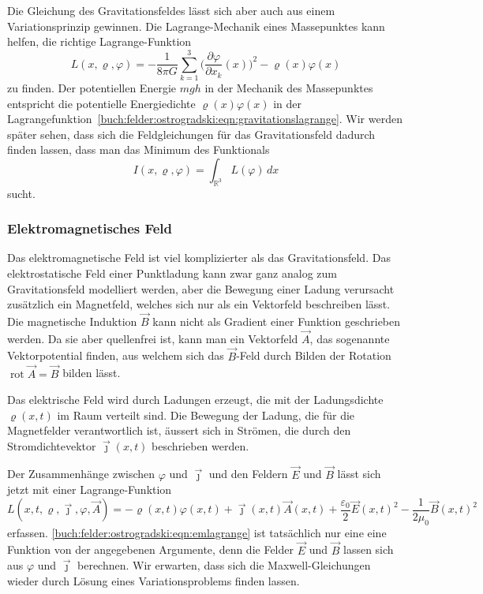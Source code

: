 Die Gleichung des Gravitationsfeldes lässt sich aber auch aus einem
Variationsprinzip gewinnen.
Die Lagrange-Mechanik eines Massepunktes kann helfen, die richtige
Lagrange-Funktion
\begin{equation}
L(x,\varrho,\varphi)
=
-\frac{1}{8\pi G}
\sum_{k=1}^3
\biggl(
\frac{\partial \varphi}{\partial x_k}(x)
\biggr)^2
-
\varrho(x)\varphi(x)
\label{buch:felder:ostrogradski:eqn:gravitationslagrange}
\end{equation}
zu finden.
Der potentiellen Energie $mgh$ in der Mechanik des Massepunktes
entspricht die potentielle Energiedichte $\varrho(x)\varphi(x)$
in der
Lagrangefunktion~\eqref{buch:felder:ostrogradski:eqn:gravitationslagrange}.
Wir werden später sehen, dass sich die Feldgleichungen für das
Gravitationsfeld dadurch finden lassen, dass man das Minimum des
Funktionals
\[
I(x,\varrho,\varphi)
=
\int_{\mathbb{R}^3} L(\varphi)
\,dx
\]
sucht.

%
%
\subsubsection{Elektromagnetisches Feld}
Das elektromagnetische Feld ist viel komplizierter als das Gravitationsfeld.
Das elektrostatische Feld einer Punktladung kann zwar ganz analog zum
Gravitationsfeld modelliert werden, aber die Bewegung einer Ladung
verursacht zusätzlich ein Magnetfeld, welches sich nur als ein
Vektorfeld beschreiben lässt.
Die magnetische Induktion $\vec{B}$ kann nicht als Gradient einer Funktion
geschrieben werden.
Da sie aber quellenfrei ist, kann man ein Vektorfeld $\vec{A}$,
das sogenannte Vektorpotential finden, aus welchem sich das $\vec{B}$-Feld
durch Bilden der Rotation $\operatorname{rot}\vec{A}=\vec{B}$ bilden
lässt.

Das elektrische Feld wird durch Ladungen erzeugt, die mit der
Ladungsdichte $\varrho(x,t)$ im Raum verteilt sind.
Die Bewegung der Ladung, die für die Magnetfelder verantwortlich ist,
äussert sich in Strömen, die durch den Stromdichtevektor $\vec{\jmath}(x,t)$
beschrieben werden.

Der Zusammenhänge zwischen $\varphi$ und $\vec{\jmath}$ und den Feldern
$\vec{E}$ und $\vec{B}$ lässt sich jetzt mit einer Lagrange-Funktion
\begin{equation}
L(x,t,\varrho,\vec{\jmath},\varphi,\vec{A})
=
-\varrho(x,t) \varphi(x,t)
+
\vec{\jmath}(x,t)\vec{A}(x,t)
+
\frac{\varepsilon_0}{2}\vec{E}(x,t)^2
-
\frac{1}{2\mu_0}\vec{B}(x,t)^2
\label{buch:felder:ostrogradski:eqn:emlagrange}
\end{equation}
erfassen.
\eqref{buch:felder:ostrogradski:eqn:emlagrange} ist tatsächlich nur
eine eine Funktion von der angegebenen Argumente, denn die Felder
$\vec{E}$ und $\vec{B}$ lassen sich aus $\varphi$ und $\vec{\jmath}$ 
berechnen.
Wir erwarten, dass sich die Maxwell-Gleichungen wieder durch
Lösung eines Variationsproblems finden lassen.

